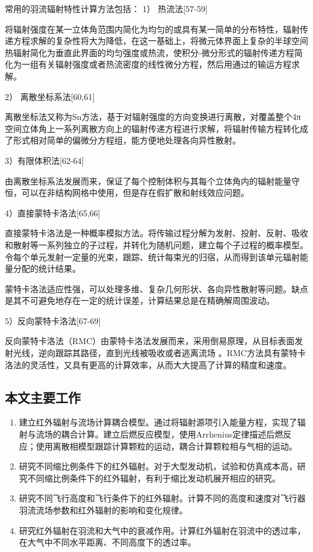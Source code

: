 常用的羽流辐射特性计算方法包括：
1）	热流法[57-59]

将辐射强度在某一立体角范围内简化为均匀的或具有某一简单的分布特性，辐射传递方程求解的复杂性将大为降低，在这一基础上，将微元体界面上复杂的半球空间热辐射简化为垂直此界面的均匀强度或热流，使积分-微分形式的辐射传递方程简化为一组有关辐射强度或者热流密度的线性微分方程，然后用通过的输运方程求解。

2）	离散坐标系法[60,61]

离散坐标法又称为Sn方法，基于对辐射强度的方向变换进行离散，对覆盖整个4π空间立体角上一系列离散方向上的辐射传递方程进行求解，将辐射传输方程转化成了形式相对简单的偏微分方程组，能方便地处理各向异性散射。

3）有限体积法[62-64]

由离散坐标系法发展而来，保证了每个控制体积与其每个立体角内的辐射能量守恒，可以在非结构网格中使用，但是存在假扩散和射线效应问题。

4）直接蒙特卡洛法[65,66]	

直接蒙特卡洛法是一种概率模拟方法。将传输过程分解为发射、投射、反射、吸收和散射等一系列独立的子过程，并转化为随机问题，建立每个子过程的概率模型。令每个单元发射一定量的光束，跟踪、统计每束光的归宿，从而得到该单元辐射能量分配的统计结果。

蒙特卡洛法适应性强，可以处理多维、复杂几何形状、各向异性散射等问题。缺点是其不可避免地存在一定的统计误差，计算结果总是在精确解周围波动。

5）反向蒙特卡洛法[67-69]

反向蒙特卡洛法（RMC）由蒙特卡洛法发展而来，采用倒易原理，从目标表面发射光线，逆向跟踪其路径，直到光线被吸收或者逃离流场 。RMC方法具有蒙特卡洛法的灵活性，又具有更高的计算效率，从而大大提高了计算的精度和速度。

\subsection{本文主要工作}
\begin{enumerate}
	\item 建立红外辐射与流场计算耦合模型。通过将辐射源项引入能量方程，实现了辐射与流场的耦合计算。建立后燃反应模型，使用Arrhenius定律描述后燃反应；使用离散相模型跟踪计算颗粒的运动，耦合计算颗粒相与气相的运动。
	\item 研究不同缩比例条件下的红外辐射。对于大型发动机，试验和仿真成本高，研究不同缩比例条件下的红外辐射，有利于缩比发动机展开相应的研究。
	\item 研究不同飞行高度和飞行条件下的红外辐射。计算不同的高度和速度对飞行器羽流流场参数和红外辐射的影响和变化规律。
	\item 研究红外辐射在羽流和大气中的衰减作用。计算红外辐射在羽流中的透过率，在大气中不同水平距离、不同高度下的透过率。
\end{enumerate}





